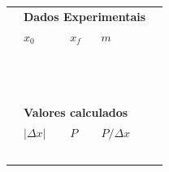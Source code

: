 \begin{table}
\centering
\begin{tabular}{lp{25mm}p{25mm}p{25mm}l}
\toprule
	& \multicolumn{3}{l}{\textbf{Dados Experimentais}} \\
	\cmidrule{2-4}
	& $x_0$ & $x_f$ & $m$ & \\
	\cmidrule{2-4}
	& \cellcolor[gray]{0.89} & \cellcolor[gray]{0.92} & \cellcolor[gray]{0.89} \\
	& \cellcolor[gray]{0.95} & \cellcolor[gray]{0.97} & \cellcolor[gray]{0.95} \\
	& \cellcolor[gray]{0.89} & \cellcolor[gray]{0.92} & \cellcolor[gray]{0.89} \\
	& \cellcolor[gray]{0.95} & \cellcolor[gray]{0.97} & \cellcolor[gray]{0.95} \\
	& \cellcolor[gray]{0.89} & \cellcolor[gray]{0.92} & \cellcolor[gray]{0.89} \\
	& \cellcolor[gray]{0.95} & \cellcolor[gray]{0.97} & \cellcolor[gray]{0.95} \\
	& \cellcolor[gray]{0.89} & \cellcolor[gray]{0.92} & \cellcolor[gray]{0.89} \\
	& \cellcolor[gray]{0.95} & \cellcolor[gray]{0.97} & \cellcolor[gray]{0.95} \\
	& \cellcolor[gray]{0.89} & \cellcolor[gray]{0.92} & \cellcolor[gray]{0.89} \\
	& \cellcolor[gray]{0.95} & \cellcolor[gray]{0.97} & \cellcolor[gray]{0.95} \\
	& \cellcolor[gray]{0.89} & \cellcolor[gray]{0.92} & \cellcolor[gray]{0.89} \\
	& \cellcolor[gray]{0.95} & \cellcolor[gray]{0.97} & \cellcolor[gray]{0.95} \\
	\cmidrule{2-4}
\\
	& \multicolumn{3}{l}{\textbf{Valores calculados}} \\
	\cmidrule{2-4}
	& $|\Delta x|$ & $P$ & $P/\Delta x$ \\
	\cmidrule{2-4}
	& \cellcolor[gray]{0.89} & \cellcolor[gray]{0.92} & \cellcolor[gray]{0.89} \\
	& \cellcolor[gray]{0.95} & \cellcolor[gray]{0.97} & \cellcolor[gray]{0.95} \\
	& \cellcolor[gray]{0.89} & \cellcolor[gray]{0.92} & \cellcolor[gray]{0.89} \\
	& \cellcolor[gray]{0.95} & \cellcolor[gray]{0.97} & \cellcolor[gray]{0.95} \\
	& \cellcolor[gray]{0.89} & \cellcolor[gray]{0.92} & \cellcolor[gray]{0.89} \\

\end{tabular}
\end{table}
